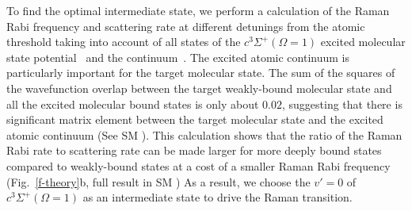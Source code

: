 \documentclass[aps,prl,twocolumn,superscriptaddress]{revtex4-1}
\newcommand{\todo}[1]{}
\begin{document}
To find the optimal intermediate state, we perform a calculation of the Raman Rabi frequency
and scattering rate at different detunings from the atomic threshold
taking into account of all states of
the $c^3\Sigma^+(\Omega = 1)$ excited molecular state potential~\cite{Grochola2011}
and the continuum~\cite{Liu2017}.
The excited atomic continuum is particularly important for the target molecular state.
The sum of the squares of the wavefunction overlap
between the target weakly-bound molecular state
and all the excited molecular bound states is only about $0.02$,
suggesting that there is significant matrix element
between the target molecular state and the excited atomic continuum (See SM \todo{proper cite}).
This calculation shows that the ratio of the Raman Rabi rate to scattering rate
can be made larger for more deeply bound states compared to weakly-bound states
at a cost of a smaller Raman Rabi frequency
(Fig.~\ref{f-theory}b, full result in SM \todo{proper cite})
As a result, we choose the $v'=0$ of $c^3\Sigma^+(\Omega = 1)$ as an intermediate state
to drive the Raman transition. %




\end{document}
